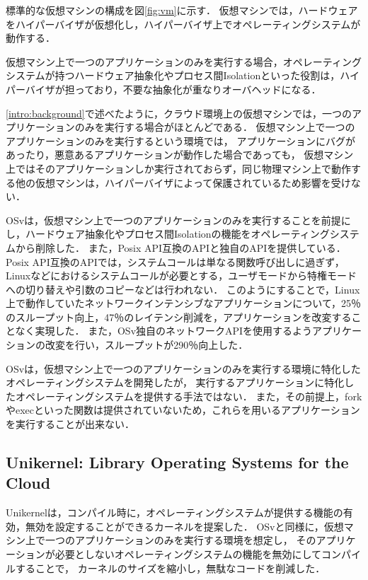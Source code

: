 \documentclass[graduation-thesis]{mlarticle}
\begin{document}
標準的な仮想マシンの構成を図\ref{fig:vm}に示す．
仮想マシンでは，ハードウェアをハイパーバイザが仮想化し，ハイパーバイザ上でオペレーティングシステムが動作する．

仮想マシン上で一つのアプリケーションのみを実行する場合，オペレーティングシステムが持つハードウェア抽象化やプロセス間Isolationといった役割は，ハイパーバイザが担っており，不要な抽象化が重なりオーバヘッドになる．

\ref{intro:background}で述べたように，クラウド環境上の仮想マシンでは，一つのアプリケーションのみを実行する場合がほとんどである．
仮想マシン上で一つのアプリケーションのみを実行するという環境では，
アプリケーションにバグがあったり，悪意あるアプリケーションが動作した場合であっても，
仮想マシン上ではそのアプリケーションしか実行されておらず，同じ物理マシン上で動作する他の仮想マシンは，ハイパーバイザによって保護されているため影響を受けない．

OSvは，仮想マシン上で一つのアプリケーションのみを実行することを前提にし，ハードウェア抽象化やプロセス間Isolationの機能をオペレーティングシステムから削除した．
また，Posix API互換のAPIと独自のAPIを提供している．Posix API互換のAPIでは，システムコールは単なる関数呼び出しに過ぎず，Linuxなどにおけるシステムコールが必要とする，ユーザモードから特権モードへの切り替えや引数のコピーなどは行われない．
このようにすることで，Linux上で動作していたネットワークインテンシブなアプリケーションについて，25％のスループット向上，47％のレイテンシ削減を，アプリケーションを改変することなく実現した．
また，OSv独自のネットワークAPIを使用するようアプリケーションの改変を行い，スループットが290％向上した．

OSvは，仮想マシン上で一つのアプリケーションのみを実行する環境に特化したオペレーティングシステムを開発したが，
実行するアプリケーションに特化したオペレーティングシステムを提供する手法ではない．
また，その前提上，forkやexecといった関数は提供されていないため，これらを用いるアプリケーションを実行することが出来ない．


\subsection {Unikernel: Library Operating Systems for the Cloud}
\label{relative:unikernel}
Unikernelは，コンパイル時に，オペレーティングシステムが提供する機能の有効，無効を設定することができるカーネルを提案した．
OSvと同様に，仮想マシン上で一つのアプリケーションのみを実行する環境を想定し，
そのアプリケーションが必要としないオペレーティングシステムの機能を無効にしてコンパイルすることで，
カーネルのサイズを縮小し，無駄なコードを削減した．
\end{document}
